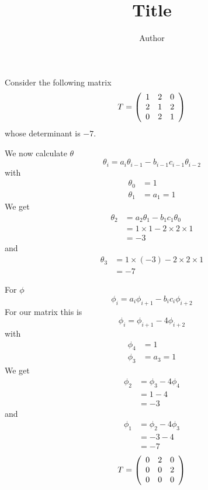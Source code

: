 \documentclass[12pt]{article}%
\begin{document}
\title{Title}
\author{Author}
\maketitle

Consider the following matrix%
\begin{equation}
T=\left(
\begin{array}
[c]{ccc}%
1 & 2 & 0\\
2 & 1 & 2\\
0 & 2 & 1
\end{array}
\right)
\end{equation}
whose determinant is $-7$.

We now calculate $\theta$%
\begin{equation}
\theta_{i}=a_{i}\theta_{i-1}-b_{i-1}c_{i-1}\theta_{i-2}%
\end{equation}
with
\begin{align}
\theta_{0}  &  =1\\
\theta_{1}  &  =a_{1}=1
\end{align}
We get%
\begin{align}
\theta_{2}  &  =a_{2}\theta_{1}-b_{1}c_{1}\theta_{0}\\
&  =1\times1-2\times2\times1\\
&  =-3
\end{align}
and%
\begin{align}
\theta_{3}  &  =1\times\left(  -3\right)  -2\times2\times1\\
&  =-7
\end{align}


For $\phi$%
\begin{equation}
\phi_{i}=a_{i}\phi_{i+1}-b_{i}c_{i}\phi_{i+2}%
\end{equation}
For our matrix this is%
\begin{equation}
\phi_{i}=\phi_{i+1}-4\phi_{i+2}%
\end{equation}
with
\begin{align}
\phi_{4} &  =1\\
\phi_{3} &  =a_{3}=1
\end{align}
We get%
\begin{align}
\phi_{2} &  =\phi_{3}-4\phi_{4}\\
&  =1-4\\
&  =-3
\end{align}
and%
\begin{align}
\phi_{1} &  =\phi_{2}-4\phi_{3}\\
&  =-3-4\\
&  =-7
\end{align}%
\begin{equation}
T=\left(
\begin{array}
[c]{ccc}%
0 & 2 & 0\\
0 & 0 & 2\\
0 & 0 & 0
\end{array}
\right)
\end{equation}




\end{document}
